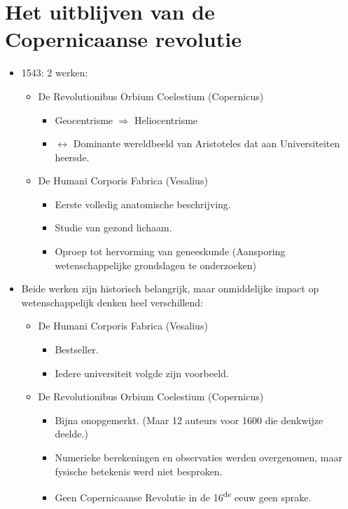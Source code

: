 \documentclass{article}
\begin{document}
  \section{Het uitblijven van de Copernicaanse revolutie}
    \begin{itemize}
      \item 1543: 2 werken:
      \begin{itemize}
        \item De Revolutionibus Orbium Coelestium (Copernicus)
        \begin{itemize}
          \item Geocentrisme $\Rightarrow$ Heliocentrisme
          \item $\leftrightarrow$ Dominante wereldbeeld van Aristoteles dat aan Universiteiten heersde.
        \end{itemize}
        \item De Humani Corporis Fabrica (Vesalius)
        \begin{itemize}
          \item Eerste volledig anatomische beschrijving.
          \item Studie van gezond lichaam.
          \item Oproep tot hervorming van geneeskunde (Aansporing wetenschappelijke grondslagen te onderzoeken)
        \end{itemize}
      \end{itemize}
      \item Beide werken zijn historisch belangrijk, maar onmiddelijke impact op wetenschappelijk denken heel verschillend:
      \begin{itemize}
        \item De Humani Corporis Fabrica (Vesalius)
        \begin{itemize}
          \item Bestseller.
          \item Iedere universiteit volgde zijn voorbeeld.
        \end{itemize}
        \item De Revolutionibus Orbium Coelestium (Copernicus)
        \begin{itemize}
          \item Bijna onopgemerkt. (Maar 12 auteurs voor 1600 die denkwijze deelde.)
          \item Numerieke berekeningen en observaties werden overgenomen, maar fysische betekenis werd niet besproken.
          \item Geen Copernicaanse Revolutie in de 16\textsuperscript{de} eeuw geen sprake.

\end{itemize}
\end{itemize}
\end{itemize}
\end{document}
